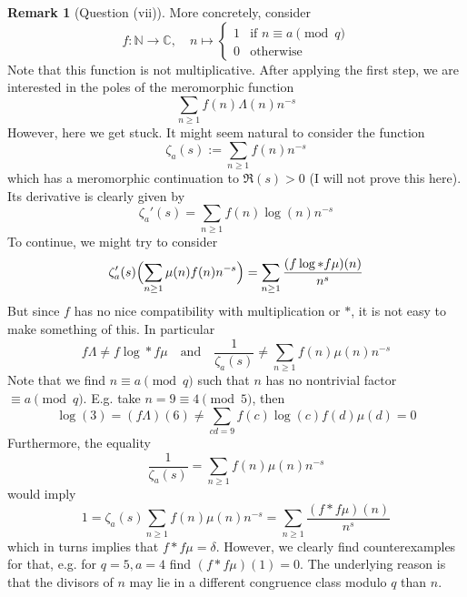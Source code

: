 \documentclass{scrartcl}
\newcommand{\N}{\mathbb{N}}
\newcommand{\C}{\mathbb{C}}
\theoremstyle{definition}
\newtheorem{remark}[definition]{Remark}
\begin{document}
\begin{remark}[Question (vii)]
    More concretely, consider
    \begin{equation*}
        f: \N \to \C, \quad n \mapsto \begin{cases}
            1 & \text{if $n \equiv a \pmod q$} \\
            0 & \text{otherwise}
        \end{cases}
    \end{equation*}
    Note that this function is not multiplicative.
    After applying the first step, we are interested in the poles of the meromorphic function
    \begin{equation*}
        \sum_{n \geq 1} f(n) \Lambda(n) n^{-s}
    \end{equation*}
    However, here we get stuck.
    It might seem natural to consider the function
    \begin{equation*}
        \zeta_a(s) := \sum_{n \geq 1} f(n) n^{-s}
    \end{equation*}
    which has a meromorphic continuation to $\Re(s) > 0$ (I will not prove this here).
    Its derivative is clearly given by
    \begin{equation*}
        \zeta_a'(s) = \sum_{n \geq 1} f(n) \log(n) n^{-s}
    \end{equation*}
    To continue, we might try to consider
    \begin{equation*}
        \zeta_a'(s)\Bigl( \sum_{n \geq 1} \mu(n) f(n) n^{-s} \Bigr) = \sum_{n \geq 1} \frac {(f\log * f\mu)(n)} {n^s}
    \end{equation*}
    But since $f$ has no nice compatibility with multiplication or $*$, it is not easy to make something of this.
    In particular
    \begin{equation*}
        f\Lambda \neq f\log * f\mu \quad \text{and} \quad \frac 1 {\zeta_a(s)} \neq \sum_{n \geq 1} f(n) \mu(n) n^{-s}
    \end{equation*}
    Note that we find $n \equiv a \pmod q$ such that $n$ has no nontrivial factor $\equiv a \pmod q$.
    E.g. take $n = 9 \equiv 4 \pmod 5$, then
    \begin{equation*}
        \log(3) = (f\Lambda)(6) \neq \sum_{cd = 9} f(c)\log(c)f(d)\mu(d) = 0
    \end{equation*}
    Furthermore, the equality
    \begin{equation*}
        \frac 1 {\zeta_a(s)} = \sum_{n \geq 1} f(n) \mu(n) n^{-s}
    \end{equation*}
    would imply
    \begin{equation*}
        1 = \zeta_a(s) \sum_{n \geq 1} f(n) \mu(n) n^{-s} = \sum_{n \geq 1} \frac {(f * f\mu)(n)} {n^s}
    \end{equation*}
    which in turns implies that $f * f\mu = \delta$.
    However, we clearly find counterexamples for that, e.g. for $q = 5, a = 4$ find $(f * f\mu)(1) = 0$.
    The underlying reason is that the divisors of $n$ may lie in a different congruence class modulo $q$ than $n$.


\end{remark}
\end{document}
